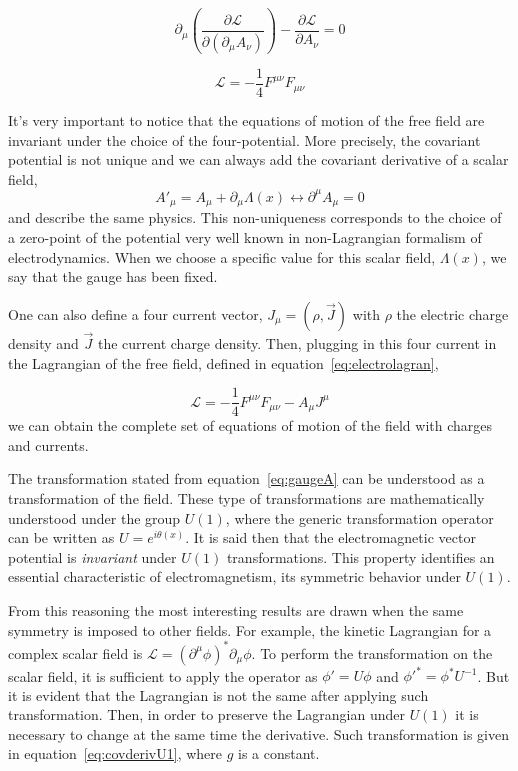 \begin{equation}
  \label{eq:electromotion}
  \partial_{\mu}\left( \frac{\partial \mathcal{L}}{\partial (\partial_{\mu}A_{\nu})} \right) -\frac{\partial \mathcal{L}}{\partial A_{\nu}}=0
\end{equation}

\begin{equation}
  \label{eq:electrolagran}
  \mathcal{L}=-\frac{1}{4}F^{\mu\nu}F_{\mu\nu}
\end{equation}

It's very important to notice that the equations of motion of the free field are invariant under the choice of the four-potential. More precisely, the covariant potential is not unique and we can always add the covariant derivative of a scalar field, 
\begin{equation}
  \label{eq:gaugeA}
  {A'}_{\mu}=A_{\mu}+\partial_{\mu}\Lambda(x) \leftrightarrow \partial^{\mu}A_{\mu}=0
\end{equation} and describe the same physics. This non-uniqueness corresponds to the choice of a zero-point of the potential very well known in non-Lagrangian formalism of electrodynamics. When we choose a specific value for this scalar field, $\Lambda(x)$, we say that the gauge has been fixed. 

One can also define a four current vector, $J_{\mu}=\left( \rho,\vec{J} \right)$ with $\rho$ the electric charge density and $\vec{J}$ the current charge density. Then, plugging in this four current in the Lagrangian of the free field, defined in equation~\ref{eq:electrolagran}, 

\begin{equation}
  \label{eq:fulleleclagrangian}
  \mathcal{L}=-\frac{1}{4}F^{\mu\nu}F_{\mu\nu}-A_{\mu}J^{\mu}
\end{equation}we can obtain the complete set of equations of motion of the field with charges and currents. 

The transformation stated from equation~\ref{eq:gaugeA} can be understood as a transformation of the field. These type of transformations are mathematically understood under the group $U(1)$, where the generic transformation operator can be written as $U=e^{i\theta(x)}$. It is said then that the electromagnetic vector potential is \textit{invariant} under $U(1)$ transformations. This property identifies an essential characteristic of electromagnetism, its symmetric behavior under $U(1)$. 

From this reasoning the most interesting results are drawn when the same symmetry is imposed to other fields. For example, the kinetic Lagrangian for a complex scalar field is $\mathcal{L}=(\partial^{\mu}\phi)^{*}\partial_{\mu}\phi$. To perform the transformation on the scalar field, it is sufficient to apply the operator as $\phi'=U\phi$ and ${\phi'}^{*}={\phi}^{*} U^{-1}$. But it is evident that the Lagrangian is not the same after applying such transformation. Then, in order to preserve the Lagrangian under $U(1)$ it is necessary to change at the same time the derivative. Such transformation is given in equation~\ref{eq:covderivU1}, where $g$ is a constant.

